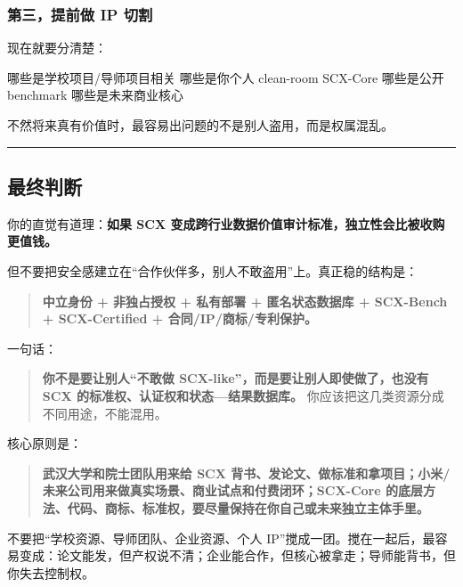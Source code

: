 \documentclass[
  12pt,
]{ctexart}
\newenvironment{Shaded}{}{}
\newcommand{\NormalTok}[1]{#1}
\begin{document}
\subsubsection{第三，提前做 IP
切割}\label{ux7b2cux4e09ux63d0ux524dux505a-ip-ux5207ux5272}

现在就要分清楚：

\begin{Shaded}
\begin{Highlighting}[]
\NormalTok{哪些是学校项目/导师项目相关}
\NormalTok{哪些是你个人 clean{-}room SCX{-}Core}
\NormalTok{哪些是公开 benchmark}
\NormalTok{哪些是未来商业核心}
\end{Highlighting}
\end{Shaded}

不然将来真有价值时，最容易出问题的不是别人盗用，而是权属混乱。

\begin{center}\rule{0.5\linewidth}{0.5pt}\end{center}

\subsection{最终判断}\label{ux6700ux7ec8ux5224ux65ad-3}

你的直觉有道理：\textbf{如果 SCX
变成跨行业数据价值审计标准，独立性会比被收购更值钱。}

但不要把安全感建立在``合作伙伴多，别人不敢盗用''上。真正稳的结构是：

\begin{quote}
\textbf{中立身份 + 非独占授权 + 私有部署 + 匿名状态数据库 + SCX-Bench +
SCX-Certified + 合同/IP/商标/专利保护。}
\end{quote}

一句话：

\begin{quote}
\textbf{你不是要让别人``不敢做 SCX-like''，而是要让别人即使做了，也没有
SCX 的标准权、认证权和状态---结果数据库。}
你应该把这几类资源分成不同用途，不能混用。
\end{quote}

核心原则是：

\begin{quote}
\textbf{武汉大学和院士团队用来给 SCX
背书、发论文、做标准和拿项目；小米/未来公司用来做真实场景、商业试点和付费闭环；SCX-Core
的底层方法、代码、商标、标准权，要尽量保持在你自己或未来独立主体手里。}
\end{quote}

不要把``学校资源、导师团队、企业资源、个人
IP''搅成一团。搅在一起后，最容易变成：论文能发，但产权说不清；企业能合作，但核心被拿走；导师能背书，但你失去控制权。
\end{document}

